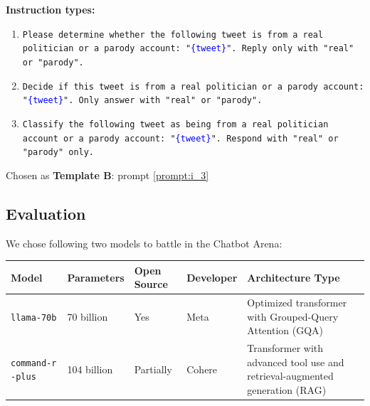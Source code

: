 \documentclass[12pt,a4paper]{article}
\begin{document}
\begin{minipage}[c]{0.46\textwidth}
\textbf{Instruction types:}\vspace{-0.3em}
\scriptsize
\begin{enumerate}[itemsep=1pt, left=0pt]
    \item \texttt{Please determine whether the following tweet is from a real politician or a parody account: "\textcolor{blue}{\{tweet\}}". Reply only with "real" or "parody".}

    
    \item \texttt{Decide if this tweet is from a real politician or a parody account: "\textcolor{blue}{\{tweet\}}". Only answer with "real" or "parody".}


    \item \texttt{Classify the following tweet as being from a real politician account or a parody account: "\textcolor{blue}{\{tweet\}}". Respond with "real" or "parody" only.} \label{prompt:i_3}

\end{enumerate}
\vspace{-2em}
\normalsize

Chosen as \textbf{Template B}: prompt \ref{prompt:i_3}
\end{minipage}
\vspace{-0.3em}

\subsection{Evaluation}

We chose following two models to battle in the Chatbot Arena: \vspace{-0.3em}
\footnotesize
\begin{center}
\begin{tabular}{ m{1.6cm} | m{1.9cm}  m{2.1cm}  m{2cm}  m{7cm} }
\textbf{Model} & \textbf{Parameters} & \textbf{Open Source} & \textbf{Developer} & \textbf{Architecture Type} \\ 
\hline
\texttt{llama-70b} & 70 billion & Yes & Meta & Optimized transformer with Grouped-Query Attention (GQA) \\ 
\hline
\texttt{command-r} \texttt{-plus} & 104 billion & Partially & Cohere & Transformer with advanced tool use and retrieval-augmented generation (RAG) \\ 
\end{tabular}
\end{center}
\normalsize
\vspace{-0.6em}
\end{document}
